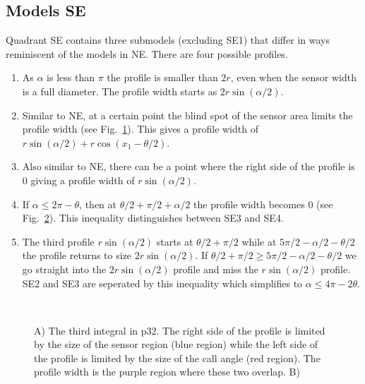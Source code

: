 \subsection{Models SE} \label{SE}

Quadrant SE contains three submodels (excluding SE1) that differ in ways reminiscent of the models in NE. There are four possible profiles.
\begin{enumerate}
\item As $\alpha$ is less than $\pi$ the profile is smaller than $2r$, even when the sensor width is a full diameter. The profile width starts as $2r\sin(\alpha/2)$.
\item Similar to NE, at a certain point the blind spot of the sensor area limits the profile width (see Fig.~\ref{f:p32AT}). This gives a profile width of $r\sin(\alpha/2) + r\cos(x_1 - \theta/2)$.
\item Also similar to NE, there can be a point where the right side of the profile is 0 giving a profile width of $r\sin(\alpha/2)$. 
\item If $\alpha \le 2\pi - \theta$, then at $\theta/2 + \pi/2 + \alpha/2 $ the profile width becomes 0 (see Fig.~\ref{f:p32Last}). This inequality distinguishes between SE3 and SE4. 
\item The third profile $r\sin(\alpha/2)$ starts at $\theta/2 + \pi/2$ while at $5\pi/2 - \alpha/2 - \theta/2$ the profile returns to size $2r\sin(\alpha/2)$. If $\theta/2 + \pi/2 \ge 5\pi/2 - \alpha/2 - \theta/2$ we go straight into the  $2r\sin(\alpha/2)$ profile and miss the $r\sin(\alpha/2)$ profile.  SE2 and SE3 are seperated by this inequality which simplifies to $\alpha \le 4\pi - 2\theta$. 

\end{enumerate}





\begin{figure}[t]
        \centering
        \begin{subfigure}[t]{0.3\textwidth}
                \centering
                \caption{}
                \label{f:p32AT}
        \end{subfigure}
~ 
        \begin{subfigure}[t]{0.3\textwidth}
                \centering
                \caption{}
                \label{f:p32Last}
        \end{subfigure}
\caption{A) The third integral in p32. The right side of the profile is limited by the size of the sensor region (blue region) while the left side of the profile is limited by the size of the call angle (red region). The profile width is the purple region where these two overlap. B)     }
\label{f:p32}
\end{figure}

